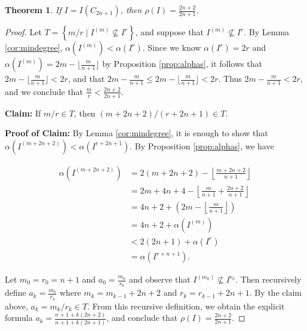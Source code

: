 \documentclass[12pt]{amsart}
\def\setof#1#2{{\left\{#1 \mid #2\right\}}}
\renewcommand{\leq}{\leqslant}
\theoremstyle{plain}
\newtheorem{theorem}{Theorem}[section]
\theoremstyle{definition}
\begin{document}
\begin{theorem}\label{thm:resurgence}
If $I=I(C_{2n+1})$, then $\rho(I) = \frac{2n+2}{2n+1}$.
\end{theorem}

\begin{proof}
Let $T = \setof{m/r}{I^{(m)}\not\subseteq I^r}$, and suppose that $I^{(m)} \not \subseteq I^r$. %
By Lemma \ref{cor:mindegree}, $\alpha(I^{(m)}) < \alpha(I^r)$. %
Since we know $\alpha(I^r) = 2r$ and $\alpha(I^{(m)}) = 2m - \lfloor \frac{m}{n+1} \rfloor$ by Proposition \ref{prop:alphas}, it follows that $2m - \lfloor \frac{m}{n+1} \rfloor < 2r$, and that $2m - \frac{m}{n+1} \leq 2m - \lfloor \frac{m}{n+1} \rfloor < 2r $. Thus $2m - \frac{m}{n+1}  < 2r$, and we conclude that
$\frac{m}{r} < \frac{2n+2}{2n+1}$.


%

\textbf{Claim:} If $m/r\in T$, then $(m+2n+2)/(r+2n+1)\in T$.

\textbf{Proof of Claim:} By Lemma \ref{cor:mindegree}, it is enough to show that $\alpha(I^{(m+2n+2)}) < \alpha(I^{r+2n+1})$. %
By Proposition \ref{prop:alphas}, we have

\begin{align*}
\alpha(I^{(m+2n+2)}) &= 2(m+2n+2) - \left\lfloor \frac{m+2n+2}{n+1}\right\rfloor\\
&= 2m+4n+4 - \left\lfloor \frac{m}{n+1} + \frac{2n+2}{n+1}\right\rfloor\\
&= 4n+2 + \left( 2m - \left\lfloor \frac{m}{n+1}\right\rfloor\right)\\
&= 4n+2 + \alpha(I^{(m)}) \\
&< 2(2n+1) + \alpha(I^r) \\
&= \alpha(I^{r+n+1}).
\end{align*}


Let $m_0 = r_0 = n+1$ and $a_0 = \frac{m_0}{r_0}$ and observe that $I^{(m_0)}\not\subseteq I^{r_0}$. 
Then recursively define  $a_{k} = \frac{m_k}{r_k}$ where $m_k =  m_{k-1}+2n+2$ and $r_k = r_{k-1}+2n+1$. 
By the claim above, $a_k = m_k/r_k \in T$. 
From this recursive definition, we obtain the explicit formula $a_{k} = \frac{n+1 + k(2n+2)}{n+1 + k(2n+1)}$, and conclude 
that $\rho(I) = \frac{2n+2}{2n+1}$.

\end{proof}
\end{document}
